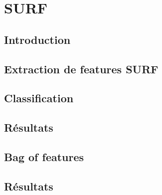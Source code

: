 \chapter{SURF}

\section{Introduction}

\section{Extraction de features SURF}

\section{Classification}

\section{Résultats}

\section{Bag of features}

\section{Résultats}